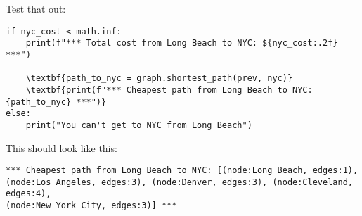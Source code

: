 Test that out:

\begin{Verbatim}[commandchars=\\\{\}]
if nyc_cost < math.inf:
    print(f"*** Total cost from Long Beach to NYC: ${nyc_cost:.2f} ***")

    \textbf{path_to_nyc = graph.shortest_path(prev, nyc)}
    \textbf{print(f"*** Cheapest path from Long Beach to NYC: {path_to_nyc} ***")}
else:
    print("You can't get to NYC from Long Beach")
\end{Verbatim}

This should look like this:
\begin{verbatim}
*** Cheapest path from Long Beach to NYC: [(node:Long Beach, edges:1),
(node:Los Angeles, edges:3), (node:Denver, edges:3), (node:Cleveland, edges:4),
(node:New York City, edges:3)] ***
\end{verbatim}
